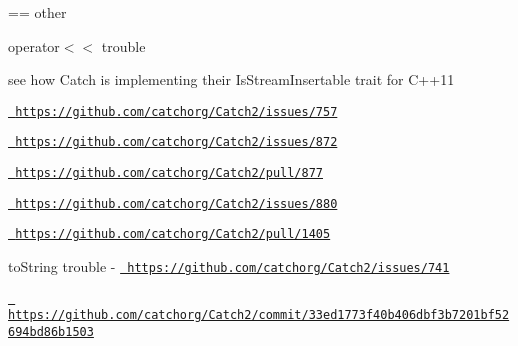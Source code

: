 == other
\begin{DoxyItemize}
\item operator\texorpdfstring{$<$}{<}\texorpdfstring{$<$}{<} trouble
\begin{DoxyItemize}
\item see how Catch is implementing their Is\+Stream\+Insertable trait for C++11
\item \href{https://github.com/catchorg/Catch2/issues/757}{\texttt{ https\+://github.\+com/catchorg/\+Catch2/issues/757}}
\item \href{https://github.com/catchorg/Catch2/issues/872}{\texttt{ https\+://github.\+com/catchorg/\+Catch2/issues/872}}
\item \href{https://github.com/catchorg/Catch2/pull/877}{\texttt{ https\+://github.\+com/catchorg/\+Catch2/pull/877}}
\item \href{https://github.com/catchorg/Catch2/issues/880}{\texttt{ https\+://github.\+com/catchorg/\+Catch2/issues/880}}
\item \href{https://github.com/catchorg/Catch2/pull/1405}{\texttt{ https\+://github.\+com/catchorg/\+Catch2/pull/1405}}
\end{DoxyItemize}
\item to\+String trouble -\/ \href{https://github.com/catchorg/Catch2/issues/741}{\texttt{ https\+://github.\+com/catchorg/\+Catch2/issues/741}}
\item \href{https://github.com/catchorg/Catch2/commit/33ed1773f40b406dbf3b7201bf52694bd86b1503}{\texttt{ https\+://github.\+com/catchorg/\+Catch2/commit/33ed1773f40b406dbf3b7201bf52694bd86b1503}} 
\end{DoxyItemize}